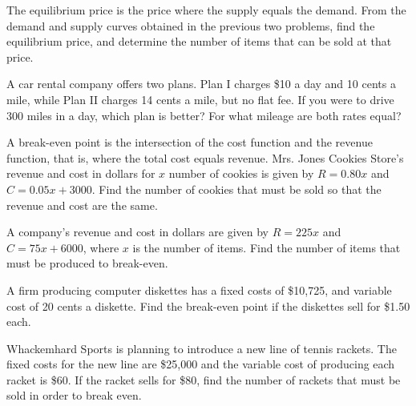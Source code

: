 \begin{puzzle}
    The equilibrium price is the price where the supply equals the demand. From the demand and supply curves obtained in the previous two problems, find the equilibrium price, and determine the number of items that can be sold at that price.

\end{puzzle}

\begin{puzzle}
    A car rental company offers two plans. Plan I charges \$10 a day and 10 cents a mile, while Plan II charges 14 cents a mile, but no flat fee. If you were to drive 300 miles in a day, which plan is better? For what mileage are both rates equal?
\end{puzzle}


\begin{puzzle} A break-even point is the intersection of the cost function and the revenue function, that is, where the total cost equals revenue. Mrs. Jones Cookies Store’s revenue and cost in dollars for \( x \) number of cookies is given by \( R = 0.80x \) and \( C = 0.05x + 3000 \). Find the number of cookies that must be sold so that the revenue and cost are the same.

\end{puzzle}

\begin{puzzle} A company’s revenue and cost in dollars are given by \( R = 225x \) and \( C = 75x + 6000 \), where \( x \) is the number of items. Find the number of items that must be produced to break-even.

\end{puzzle}

\begin{puzzle} A firm producing computer diskettes has a fixed costs of \$10,725, and variable cost of 20 cents a diskette. Find the break-even point if the diskettes sell for \$1.50 each.

\end{puzzle}

\begin{puzzle} Whackemhard Sports is planning to introduce a new line of tennis rackets. The fixed costs for the new line are \$25,000 and the variable cost of producing each racket is \$60. If the racket sells for \$80, find the number of rackets that must be sold in order to break even.
\end{puzzle}